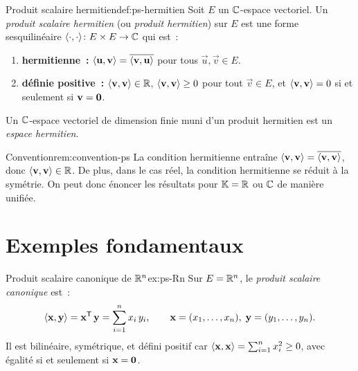 \begin{definition}{Produit scalaire hermitien}{def:ps-hermitien}
  Soit $E$ un ${\mathbb{C}}$-espace vectoriel. Un \emph{produit scalaire hermitien}
  (ou \emph{produit hermitien}) sur $E$ est une forme sesquilinéaire
  $\langle\cdot,\cdot\rangle\colon E\times E\to{\mathbb{C}}$ qui est~:
  \begin{enumerate}[label=(\roman*)]
    \item \textbf{hermitienne~:} $\langle\mathbf{u},\mathbf{v}\rangle
      =\overline{\langle\mathbf{v},\mathbf{u}\rangle}$ pour tous $\vec{u},\vec{v}\in E$.
    \item \textbf{définie positive~:} $\langle\mathbf{v},\mathbf{v}\rangle\in{\mathbb{R}}$,
      $\langle\mathbf{v},\mathbf{v}\rangle\geq 0$ pour tout $\vec{v}\in E$, et
      $\langle\mathbf{v},\mathbf{v}\rangle=0$ si et seulement si $\mathbf{v}=\mathbf{0}$.
  \end{enumerate}
  Un ${\mathbb{C}}$-espace vectoriel de dimension finie muni d'un produit hermitien
  est un \emph{espace hermitien}.
\end{definition}

\begin{remark}{Convention}{rem:convention-ps}
  La condition hermitienne entraîne
  $\langle\mathbf{v},\mathbf{v}\rangle=\overline{\langle\mathbf{v},\mathbf{v}\rangle}$, donc
  $\langle\mathbf{v},\mathbf{v}\rangle\in{\mathbb{R}}$. De plus, dans le cas réel, la
  condition hermitienne se réduit à la symétrie. On peut donc énoncer
  les résultats pour ${\mathbb{K}}={\mathbb{R}}$ ou ${\mathbb{C}}$ de manière unifiée.
\end{remark}

\section{Exemples fondamentaux}\label{sec:exemples-ps}

\begin{example}{Produit scalaire canonique de ${\mathbb{R}}^n$}{ex:ps-Rn}
  Sur $E={\mathbb{R}}^n$, le \emph{produit scalaire canonique} est~:
  \[
    \langle\mathbf{x},\mathbf{y}\rangle
    ={\mathbf{x}}^{\mathsf{T}}\,\mathbf{y}
    =\sum_{i=1}^n x_i\,y_i,\qquad
    \mathbf{x}=(x_1,\ldots,x_n),\;\mathbf{y}=(y_1,\ldots,y_n).
  \]
  Il est bilinéaire, symétrique, et défini positif car
  $\langle\mathbf{x},\mathbf{x}\rangle=\sum_{i=1}^n x_i^2\geq 0$, avec égalité si
  et seulement si $\mathbf{x}=\mathbf{0}$.
\end{example}

